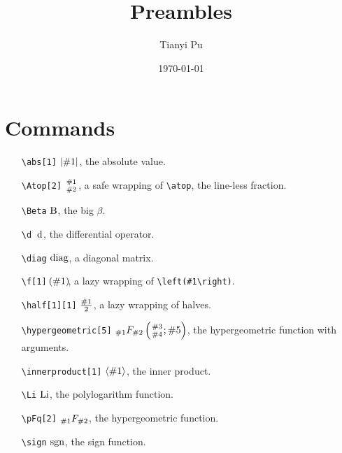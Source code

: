 \documentclass{article}
\title{Preambles}
\author{Tianyi Pu}
\date{\today}
\begin{document}
\maketitle

\section{Commands}
\begin{itemize}
    \item[\texttt{\textbackslash abs[1]}] $\abs{\#1}$, the absolute value.
    \item[\texttt{\textbackslash Atop[2]}] $\Atop{\#1}{\#2}$, a safe wrapping of \texttt{\textbackslash atop}, the line-less fraction.
    \item[\texttt{\textbackslash Beta}] $\Beta$, the big $\beta$.
    \item[\texttt{\textbackslash d}] $\d$, the differential operator.
    \item[\texttt{\textbackslash diag}] $\diag$, a diagonal matrix.
    \item[\texttt{\textbackslash f[1]}] $\f{\#1}$, a lazy wrapping of \texttt{\textbackslash left(\#1\textbackslash right)}.
    \item[\texttt{\textbackslash half[1][1]}] $\half[\#1]$, a lazy wrapping of halves.
    \item[\texttt{\textbackslash hypergeometric[5]}] $\hypergeometric{\#1}{\#2}{\#3}{\#4}{\#5}$, the hypergeometric function with arguments.
    \item[\texttt{\textbackslash innerproduct[1]}] $\innerproduct{\#1}$, the inner product.
    \item[\texttt{\textbackslash Li}] $\Li$, the polylogarithm function.
    \item[\texttt{\textbackslash pFq[2]}] $\pFq{\#1}{\#2}$, the hypergeometric function.
    \item[\texttt{\textbackslash sign}] $\sign$, the sign function.
\end{itemize}

\nocite{*}


\end{document}
